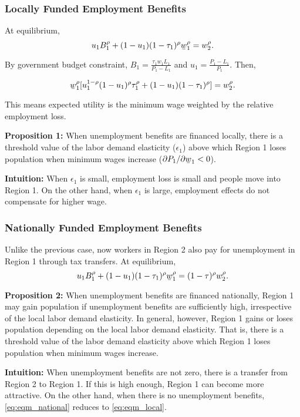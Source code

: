 \documentclass[a4paper, 12pt]{article}
\newcommand{\ubar}[1]{\text{\b{$#1$}}}
\begin{document}
\subsubsection{Locally Funded Employment Benefits}

At equilibrium,
$$
u_1B_1^\rho + (1-u_1)(1-\tau_1)^\rho \ubar{w}_1^\rho =
w_2^\rho.
$$

By government budget constraint, $B_1 = \frac{\tau_1w_1L_1}{P_1-L_1}$ and $u_1 = \frac{P_1 - L_1}{P_1}$. Then,

\begin{equation}
\ubar{w}_1^\rho [
u_1^{1-\rho}(1-u_1)^\rho\tau_1^\rho+(1-u_1)(1-\tau_1)^\rho
] =
w_2^\rho.
\label{eq:eqm_local}
\end{equation}

This means expected utility is the minimum wage weighted by the relative employment loss.

\textbf{Proposition 1:} When unemployment benefits are financed locally, there is a threshold value of the labor demand elasticity ($\epsilon_1$) above which Region 1 loses population when minimum wages increase ($\partial P_1/\partial \ubar{w}_1 < 0$).

\textbf{Intuition:} When $\epsilon_1$ is small, employment loss is small and people move into Region 1. On the other hand, when $\epsilon_1$ is large, employment effects do not compensate for higher wage.

\subsubsection{Nationally Funded Employment Benefits}
Unlike the previous case, now workers in Region 2 also pay for unemployment in Region 1 through tax transfers. At equilibrium,
\begin{equation}
u_1B_1^\rho + (1-u_1)(1-\tau_1)^\rho \ubar{w}_1^\rho =
(1-\tau)^\rho w_2^\rho.
\label{eq:eqm_national}
\end{equation}

\textbf{Proposition 2:} When unemployment benefits are financed nationally, Region 1 may gain population if unemployment benefits are sufficiently high, irrespective of the local labor demand elasticity. In general, however, Region 1 gains or loses population depending on the local labor demand elasticity. That is, there is a threshold value of the labor demand elasticity above which Region 1 loses population when minimum wages increase.

\textbf{Intuition:} When unemployment benefits are not zero, there is a transfer from Region 2 to Region 1. If this is high enough, Region 1 can become more attractive. On the other hand, when there is no unemployment benefits, \eqref{eq:eqm_national} reduces to \eqref{eq:eqm_local}.
\end{document}
